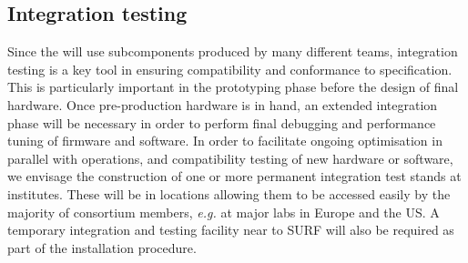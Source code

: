 \subsection{Integration testing}

Since the  will use subcomponents produced by many different teams,
integration testing is a key tool in ensuring compatibility and
conformance to specification. This is particularly important in the
prototyping phase before the design of final hardware. Once
pre-production hardware is in hand, an extended integration phase will
be necessary in order to perform final debugging and performance tuning
of firmware and software. In order to facilitate ongoing optimisation in
parallel with operations, and compatibility testing of new hardware or
software, we envisage the construction of one or more permanent
integration test stands at  institutes. These will be in locations
allowing them to be accessed easily by the majority of consortium
members, {\it e.g.} at major labs in Europe and the US. A temporary 
integration and testing facility near to SURF will also be required as
part of the installation procedure.
